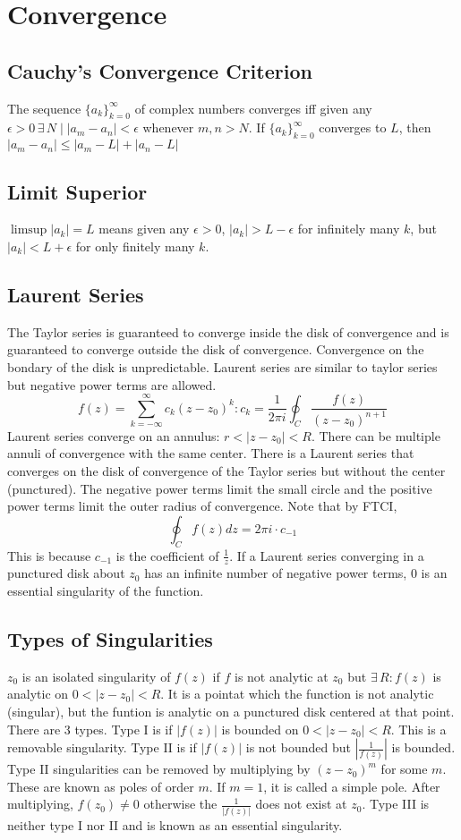 \documentclass[../main.tex]{subfiles}
\begin{document}
\chapter{Convergence}
\section{Cauchy's Convergence Criterion}
The sequence $\{a_{k}\}_{k=0}^{\infty}$ of complex numbers converges
iff given any $\epsilon > 0\,\exists\, N\mid |a_{m}-a_{n}|<\epsilon$
whenever $m,n>N$. If $\{a_{k}\}_{k=0}^{\infty}$ converges to $L$,
then $|a_{m}-a_{n}|\leq |a_{m}-L|+|a_{n}-L|$

\section{Limit Superior}
$\limsup |a_{k}|=L$ means given any $\epsilon > 0$, $|a_{k}|>L-\epsilon$
for infinitely many $k$, but $|a_{k}|<L+\epsilon$ for only finitely many $k$.

\section{Laurent Series}
The Taylor series is guaranteed to converge inside the disk of convergence and 
is guaranteed to converge outside the disk of convergence. Convergence on the bondary
of the disk is unpredictable. Laurent series are similar to taylor series but negative 
power terms are allowed. 
$$f(z)=\sum_{k=-\infty}^{\infty}c_{k}(z-z_{0})^{k}:
c_{k}=\frac{1}{2\pi i}\oint_{C}\frac{f(z)}{(z-z_{0})^{n+1}}$$
Laurent series converge on an annulus: $r<|z-z_{0}|<R$. There can be multiple annuli of convergence
with the same center. There is a Laurent series that converges on the disk of convergence of the Taylor
series but without the center (punctured). The negative power terms limit the small circle and the
positive power terms limit the outer radius of convergence. Note that by FTCI,
$$\oint_{C}f(z)dz=2\pi i\cdot c_{-1}$$ 
This is because $c_{-1}$ is the coefficient of $\frac{1}{z}$.
If a Laurent series converging in a punctured disk about $z_{0}$ has an infinite number of negative power
terms, $0$ is an essential singularity of the function.

\section{Types of Singularities}
$z_{0}$ is an isolated singularity of $f(z)$ if $f$ is not analytic at $z_{0}$ but 
$\exists\, R:f(z)$ is analytic on $0<|z-z_{0}|<R$. It is a pointat which the function 
is not analytic (singular), but the funtion is analytic on a punctured disk centered at
that point. There are 3 types. Type I is if $|f(z)|$ is bounded on $0<|z-z_{0}|<R$. This is
a removable singularity. Type II is if $|f(z)|$ is not bounded but $|\frac{1}{f(z)}|$ is bounded.
Type II singularities can be removed by multiplying by $(z-z_{0})^{m}$ for some $m$. These are
known as poles of order $m$. If $m=1$, it is called a simple pole. After multiplying, $f(z_{0})\neq 0$
otherwise the $\frac{1}{|f(z)|}$ does not exist at $z_{0}$. Type III is neither type I nor II
and is known as an essential singularity. 
\end{document}
